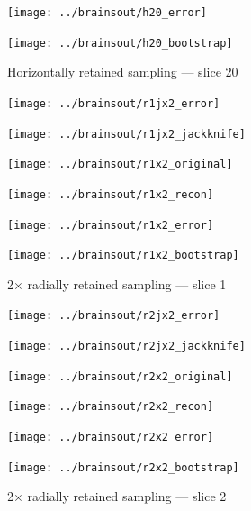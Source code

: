 \documentclass[article]{jdssv}
\begin{document}
\begin{appendix}
\begin{figure}
\begin{centering}
\parbox{\imsize}{\texttt{[image: ../brainsout/h20\_error]}}
\parbox{\imsize}{\texttt{[image: ../brainsout/h20\_bootstrap]}}

\end{centering}
\caption{Horizontally retained sampling --- slice 20}
\end{figure}


\begin{figure}
\begin{centering}

\parbox{\imsize}{\texttt{[image: ../brainsout/r1jx2\_error]}}
\parbox{\imsize}{\texttt{[image: ../brainsout/r1jx2\_jackknife]}}

\vspace{\vertsep}

\parbox{\imsize}{\texttt{[image: ../brainsout/r1x2\_original]}}
\parbox{\imsize}{\texttt{[image: ../brainsout/r1x2\_recon]}}

\vspace{\vertsep}

\parbox{\imsize}{\texttt{[image: ../brainsout/r1x2\_error]}}
\parbox{\imsize}{\texttt{[image: ../brainsout/r1x2\_bootstrap]}}

\end{centering}
\caption{2$\times$ radially retained sampling --- slice 1}
\end{figure}


\begin{figure}
\begin{centering}

\parbox{\imsize}{\texttt{[image: ../brainsout/r2jx2\_error]}}
\parbox{\imsize}{\texttt{[image: ../brainsout/r2jx2\_jackknife]}}

\vspace{\vertsep}

\parbox{\imsize}{\texttt{[image: ../brainsout/r2x2\_original]}}
\parbox{\imsize}{\texttt{[image: ../brainsout/r2x2\_recon]}}

\vspace{\vertsep}

\parbox{\imsize}{\texttt{[image: ../brainsout/r2x2\_error]}}
\parbox{\imsize}{\texttt{[image: ../brainsout/r2x2\_bootstrap]}}

\end{centering}
\caption{2$\times$ radially retained sampling --- slice 2}
\end{figure}


\begin{figure}
\begin{centering}


\end{centering}
\end{figure}
\end{appendix}
\end{document}
